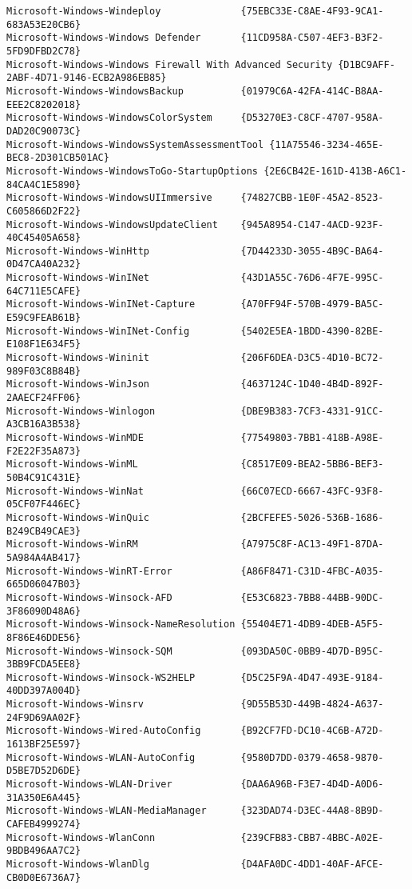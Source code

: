 \documentclass{report}
\begin{document}
\begin{lstlisting}[breaklines=true,basicstyle=\tiny]
Microsoft-Windows-Windeploy              {75EBC33E-C8AE-4F93-9CA1-683A53E20CB6}
Microsoft-Windows-Windows Defender       {11CD958A-C507-4EF3-B3F2-5FD9DFBD2C78}
Microsoft-Windows-Windows Firewall With Advanced Security {D1BC9AFF-2ABF-4D71-9146-ECB2A986EB85}
Microsoft-Windows-WindowsBackup          {01979C6A-42FA-414C-B8AA-EEE2C8202018}
Microsoft-Windows-WindowsColorSystem     {D53270E3-C8CF-4707-958A-DAD20C90073C}
Microsoft-Windows-WindowsSystemAssessmentTool {11A75546-3234-465E-BEC8-2D301CB501AC}
Microsoft-Windows-WindowsToGo-StartupOptions {2E6CB42E-161D-413B-A6C1-84CA4C1E5890}
Microsoft-Windows-WindowsUIImmersive     {74827CBB-1E0F-45A2-8523-C605866D2F22}
Microsoft-Windows-WindowsUpdateClient    {945A8954-C147-4ACD-923F-40C45405A658}
Microsoft-Windows-WinHttp                {7D44233D-3055-4B9C-BA64-0D47CA40A232}
Microsoft-Windows-WinINet                {43D1A55C-76D6-4F7E-995C-64C711E5CAFE}
Microsoft-Windows-WinINet-Capture        {A70FF94F-570B-4979-BA5C-E59C9FEAB61B}
Microsoft-Windows-WinINet-Config         {5402E5EA-1BDD-4390-82BE-E108F1E634F5}
Microsoft-Windows-Wininit                {206F6DEA-D3C5-4D10-BC72-989F03C8B84B}
Microsoft-Windows-WinJson                {4637124C-1D40-4B4D-892F-2AAECF24FF06}
Microsoft-Windows-Winlogon               {DBE9B383-7CF3-4331-91CC-A3CB16A3B538}
Microsoft-Windows-WinMDE                 {77549803-7BB1-418B-A98E-F2E22F35A873}
Microsoft-Windows-WinML                  {C8517E09-BEA2-5BB6-BEF3-50B4C91C431E}
Microsoft-Windows-WinNat                 {66C07ECD-6667-43FC-93F8-05CF07F446EC}
Microsoft-Windows-WinQuic                {2BCFEFE5-5026-536B-1686-B249CB49CAE3}
Microsoft-Windows-WinRM                  {A7975C8F-AC13-49F1-87DA-5A984A4AB417}
Microsoft-Windows-WinRT-Error            {A86F8471-C31D-4FBC-A035-665D06047B03}
Microsoft-Windows-Winsock-AFD            {E53C6823-7BB8-44BB-90DC-3F86090D48A6}
Microsoft-Windows-Winsock-NameResolution {55404E71-4DB9-4DEB-A5F5-8F86E46DDE56}
Microsoft-Windows-Winsock-SQM            {093DA50C-0BB9-4D7D-B95C-3BB9FCDA5EE8}
Microsoft-Windows-Winsock-WS2HELP        {D5C25F9A-4D47-493E-9184-40DD397A004D}
Microsoft-Windows-Winsrv                 {9D55B53D-449B-4824-A637-24F9D69AA02F}
Microsoft-Windows-Wired-AutoConfig       {B92CF7FD-DC10-4C6B-A72D-1613BF25E597}
Microsoft-Windows-WLAN-AutoConfig        {9580D7DD-0379-4658-9870-D5BE7D52D6DE}
Microsoft-Windows-WLAN-Driver            {DAA6A96B-F3E7-4D4D-A0D6-31A350E6A445}
Microsoft-Windows-WLAN-MediaManager      {323DAD74-D3EC-44A8-8B9D-CAFEB4999274}
Microsoft-Windows-WlanConn               {239CFB83-CBB7-4BBC-A02E-9BDB496AA7C2}
Microsoft-Windows-WlanDlg                {D4AFA0DC-4DD1-40AF-AFCE-CB0D0E6736A7}

\end{lstlisting}
\end{document}
